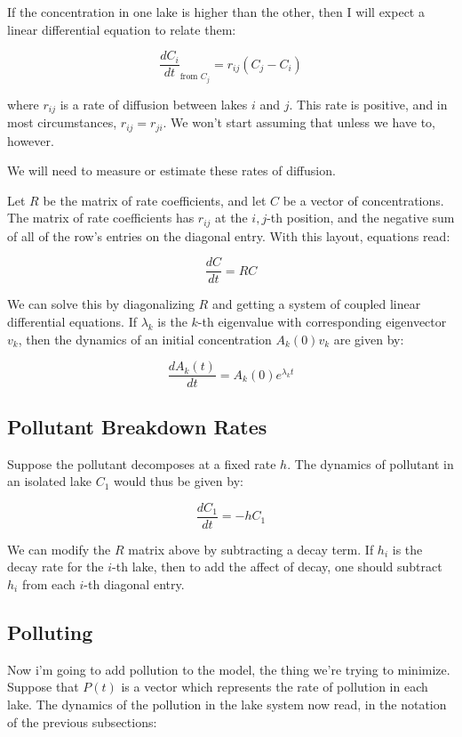 \documentclass{article}
\begin{document}
If the concentration in one lake is higher than the other,
	then I will expect a linear differential equation to relate them:

\[ \frac{dC_i}{dt}_{\text{from $C_j$}} = r_{i j} \left( C_j - C_i \right) \]

where $r_{i j}$ is a rate of diffusion between lakes $i$ and $j$.
This rate is positive, and in most circumstances, $r_{i j} = r_{j i}$.
We won't start assuming that unless we have to, however.

We will need to measure or estimate these rates of diffusion.

Let $R$ be the matrix of rate coefficients, and let $C$ be a vector
	of concentrations.
The matrix of rate coefficients has $r_{i j}$ at the $i,j$-th position,
	and the negative sum of all of the row's entries on the diagonal entry.
With this layout, equations read:

\[ \frac{dC}{dt} = R C \]

We can solve this by diagonalizing $R$ and getting a system of coupled
	linear differential equations.
If $\lambda_k$ is the $k$-th eigenvalue with corresponding eigenvector
	$v_k$, then the dynamics of an initial concentration $A_k(0) v_k$ are
	given by:

\[ \frac{dA_k(t)}{dt} = A_k(0) e^{\lambda_k t} \]

\subsection{Pollutant Breakdown Rates}

Suppose the pollutant decomposes at a fixed rate $h$.
The dynamics of pollutant in an isolated lake $C_1$ would
	thus be given by:

\[ \frac{dC_1}{dt} = - h C_1 \]

We can modify the $R$ matrix above by subtracting a decay term.
If $h_i$ is the decay rate for the $i$-th lake, then to add the affect
	of decay, one should subtract $h_i$ from each $i$-th diagonal entry.

\subsection{Polluting}

Now i'm going to add pollution to the model, the thing we're trying to
	minimize.
Suppose that $P(t)$ is a vector which represents the rate of pollution
	in each lake.
The dynamics of the pollution in the lake system now read, in the notation
	of the previous subsections:
\end{document}
